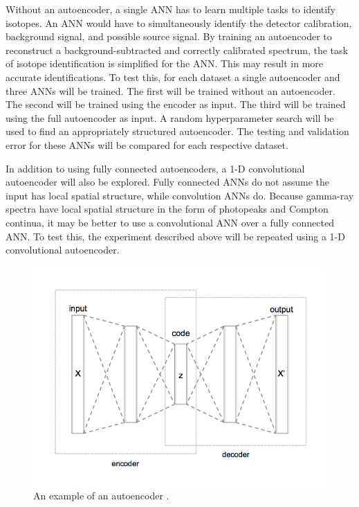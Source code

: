 \documentclass[tocnosub,noragright,centerchapter,12pt,fullpage]{uiucecethesis09}
\begin{document}
Without an autoencoder, a single ANN has to learn multiple tasks to identify isotopes. An ANN would have to simultaneously identify the detector calibration, background signal, and possible source signal. By training an autoencoder to reconstruct a background-subtracted and correctly calibrated spectrum, the task of isotope identification is simplified for the ANN. This may result in more accurate identifications. To test this, for each dataset a single autoencoder and three ANNs will be trained. The first will be trained without an autoencoder. The second will be trained using the encoder as input. The third will be trained using the full autoencoder as input. A random hyperparameter search will be used to find an appropriately structured autoencoder. The testing and validation error for these ANNs will be compared for each respective dataset.

In addition to using fully connected autoencoders, a 1-D convolutional autoencoder will also be explored. Fully connected ANNs do not assume the input has local spatial structure, while convolution ANNs do. Because gamma-ray spectra have local spatial structure in the form of photopeaks and Compton continua, it may be better to use a convolutional ANN over a fully connected ANN. To test this, the experiment described above will be repeated using a 1-D convolutional autoencoder.


\begin{figure}[H]
\centering
\includegraphics[width=0.8\linewidth]{images/Autoencoder_structure}
\caption{An example of an autoencoder \cite{wiki:AutoencoderStructure}.}
\label{fig:Autoencoder_structure}
\end{figure}
\end{document}
